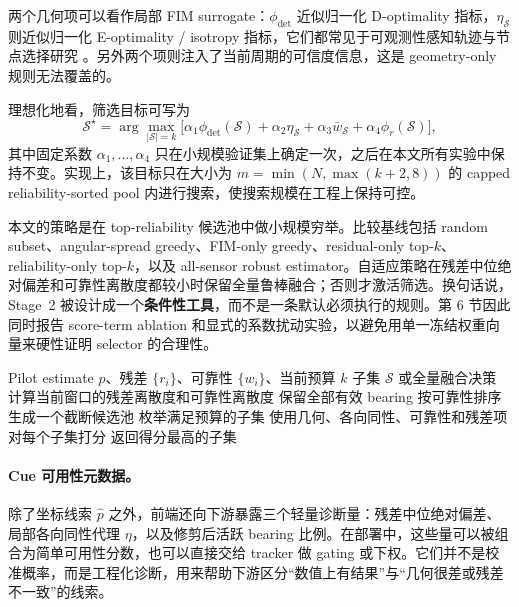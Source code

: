 \documentclass[drones,article,submit,moreauthors]{Definitions/mdpi}
\begin{document}
两个几何项可以看作局部 FIM surrogate：$\phi_{\det}$ 近似归一化 D-optimality 指标，$\eta_{\mathcal{S}}$ 则近似归一化 E-optimality / isotropy 指标，它们都常见于可观测性感知轨迹与节点选择研究 \cite{zou2024revisit,dogancay2024bayesian,chen2025variable}。另外两个项则注入了当前周期的可信度信息，这是 geometry-only 规则无法覆盖的。

理想化地看，筛选目标可写为
\begin{equation}
\mathcal{S}^{\star}=
\arg\max_{|\mathcal{S}|=k}
\Big[
\alpha_1 \phi_{\det}(\mathcal{S})
+\alpha_2 \eta_{\mathcal{S}}
+\alpha_3 \bar{w}_{\mathcal{S}}
+\alpha_4 \phi_r(\mathcal{S})
\Big],
\end{equation}
其中固定系数 $\alpha_1,\dots,\alpha_4$ 只在小规模验证集上确定一次，之后在本文所有实验中保持不变。实现上，该目标只在大小为 $m=\min(N,\max(k+2,8))$ 的 capped reliability-sorted pool 内进行搜索，使搜索规模在工程上保持可控。

本文的策略是在 top-reliability 候选池中做小规模穷举。比较基线包括 random subset、angular-spread greedy、FIM-only greedy、residual-only top-$k$、reliability-only top-$k$，以及 all-sensor robust estimator。自适应策略在残差中位绝对偏差和可靠性离散度都较小时保留全量鲁棒融合；否则才激活筛选。换句话说，Stage~2 被设计成一个\textbf{条件性工具}，而不是一条默认必须执行的规则。第 6 节因此同时报告 score-term ablation 和显式的系数扰动实验，以避免用单一冻结权重向量来硬性证明 selector 的合理性。

\begin{algorithm}[!htbp]
\caption{自适应预算筛选}
\label{alg:screening}
\begin{algorithmic}
\Require Pilot estimate $\hat{p}$、残差 $\{r_i\}$、可靠性 $\{w_i\}$、当前预算 $k$
\Ensure 子集 $\mathcal{S}$ 或全量融合决策
\State 计算当前窗口的残差离散度和可靠性离散度
    \State 保留全部有效 bearing
\Else
    \State 按可靠性排序生成一个截断候选池
    \State 枚举满足预算的子集
    \State 使用几何、各向同性、可靠性和残差项对每个子集打分
    \State 返回得分最高的子集
\EndIf
\end{algorithmic}
\end{algorithm}

\paragraph{Cue 可用性元数据。}
除了坐标线索 $\hat{p}$ 之外，前端还向下游暴露三个轻量诊断量：残差中位绝对偏差、局部各向同性代理 $\eta$，以及修剪后活跃 bearing 比例。在部署中，这些量可以被组合为简单可用性分数，也可以直接交给 tracker 做 gating 或下权。它们并不是校准概率，而是工程化诊断，用来帮助下游区分“数值上有结果”与“几何很差或残差不一致”的线索。
\end{document}
